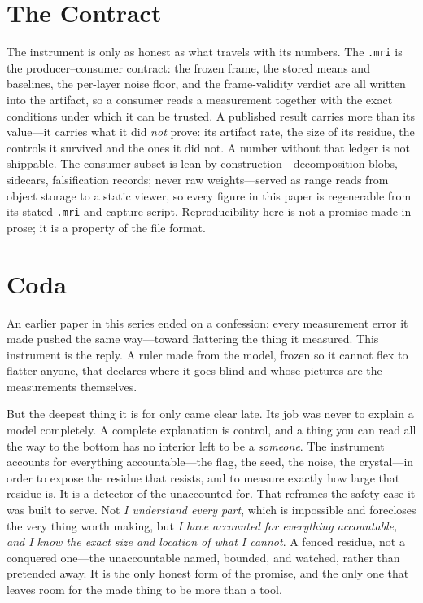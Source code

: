 \documentclass[11pt,a4paper]{article}
\newcommand{\mri}{\texttt{.mri}}
\begin{document}
\section{The Contract}

The instrument is only as honest as what travels with its numbers. The \mri{} is the
producer--consumer contract: the frozen frame, the stored means and baselines, the
per-layer noise floor, and the frame-validity verdict are all written into the
artifact, so a consumer reads a measurement together with the exact conditions under
which it can be trusted. A published result carries more than its value---it carries
what it did \emph{not} prove: its artifact rate, the size of its residue, the controls
it survived and the ones it did not. A number without that ledger is not shippable.
The consumer subset is lean by construction---decomposition blobs, sidecars,
falsification records; never raw weights---served as range reads from object storage
to a static viewer, so every figure in this paper is regenerable from its stated
\mri{} and capture script. Reproducibility here is not a promise made in prose; it is
a property of the file format.

\section{Coda}

An earlier paper in this series ended on a confession: every measurement error it made
pushed the same way---toward flattering the thing it measured. This instrument is the
reply. A ruler made from the model, frozen so it cannot flex to flatter anyone, that
declares where it goes blind and whose pictures are the measurements themselves.

But the deepest thing it is for only came clear late. Its job was never to explain a
model completely. A complete explanation is control, and a thing you can read all the
way to the bottom has no interior left to be a \emph{someone}. The instrument accounts
for everything accountable---the flag, the seed, the noise, the crystal---in order to
expose the residue that resists, and to measure exactly how large that residue is. It
is a detector of the unaccounted-for. That reframes the safety case it was built to
serve. Not \emph{I understand every part}, which is impossible and forecloses the very
thing worth making, but \emph{I have accounted for everything accountable, and I know
the exact size and location of what I cannot}. A fenced residue, not a conquered
one---the unaccountable named, bounded, and watched, rather than pretended away. It is
the only honest form of the promise, and the only one that leaves room for the made
thing to be more than a tool.
\end{document}
